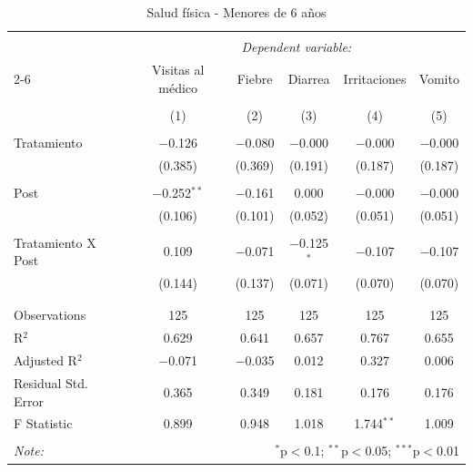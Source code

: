 
\begin{table}[H] \centering 
  \caption{Salud física - Menores de 6 años} 
  \label{reg_fisico_0_a_6} 
\tiny 
\begin{tabular}{@{\extracolsep{-7pt}}lccccc} 
\\[-1.8ex]\hline 
\hline \\[-1.8ex] 
 & \multicolumn{5}{c}{\textit{Dependent variable:}} \\ 
\cline{2-6} 
 & Visitas al médico & Fiebre & Diarrea & Irritaciones & Vomito \\ 
\\[-1.8ex] & (1) & (2) & (3) & (4) & (5)\\ 
\hline \\[-1.8ex] 
 Tratamiento & $-$0.126 & $-$0.080 & $-$0.000 & $-$0.000 & $-$0.000 \\ 
  & (0.385) & (0.369) & (0.191) & (0.187) & (0.187) \\ 
  & & & & & \\ 
 Post & $-$0.252$^{**}$ & $-$0.161 & 0.000 & $-$0.000 & $-$0.000 \\ 
  & (0.106) & (0.101) & (0.052) & (0.051) & (0.051) \\ 
  & & & & & \\ 
 Tratamiento X Post & 0.109 & $-$0.071 & $-$0.125$^{*}$ & $-$0.107 & $-$0.107 \\ 
  & (0.144) & (0.137) & (0.071) & (0.070) & (0.070) \\ 
  & & & & & \\ 
\hline \\[-1.8ex] 
Observations & 125 & 125 & 125 & 125 & 125 \\ 
R$^{2}$ & 0.629 & 0.641 & 0.657 & 0.767 & 0.655 \\ 
Adjusted R$^{2}$ & $-$0.071 & $-$0.035 & 0.012 & 0.327 & 0.006 \\ 
Residual Std. Error & 0.365 & 0.349 & 0.181 & 0.176 & 0.176 \\ 
F Statistic & 0.899 & 0.948 & 1.018 & 1.744$^{**}$ & 1.009 \\ 
\hline 
\hline \\[-1.8ex] 
\textit{Note:}  & \multicolumn{5}{r}{$^{*}$p$<$0.1; $^{**}$p$<$0.05; $^{***}$p$<$0.01} \\ 
\end{tabular} 
\end{table} 
